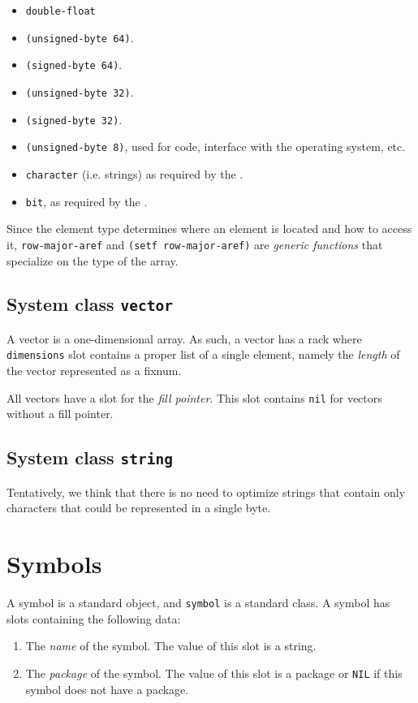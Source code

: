 \begin{itemize}
\item \texttt{double-float}
\item \texttt{(unsigned-byte 64)}.
\item \texttt{(signed-byte 64)}.
\item \texttt{(unsigned-byte 32)}.
\item \texttt{(signed-byte 32)}.
\item \texttt{(unsigned-byte 8)}, used for code, interface with the
  operating system, etc.
\item \texttt{character} (i.e. strings) as required by the \hs{}.
\item \texttt{bit}, as required by the \hs{}.
\end{itemize}

Since the element type determines where an element is located and how
to access it, \texttt{row-major-aref} and \texttt{(setf
  row-major-aref)} are \emph{generic functions} that specialize on the
type of the array.

\subsection{System class \texttt{vector}}

A vector is a one-dimensional array.  As such, a vector has a rack
where \texttt{dimensions} slot contains a proper list of a single
element, namely the \emph{length} of the vector represented as a
fixnum.

All vectors have a slot for the \emph{fill pointer}.  This slot
contains \texttt{nil} for vectors without a fill pointer.

\subsection{System class \texttt{string}}

Tentatively, we think that there is no need to optimize strings that
contain only characters that could be represented in a single byte.

\section{Symbols}

A symbol is a standard object, and \texttt{symbol} is a standard
class.  A symbol has slots containing the following data:

\begin{enumerate}
\item The \emph{name} of the symbol.  The value of this slot is a
  string.
\item The \emph{package} of the symbol.  The value of this slot is a
  package or \texttt{NIL} if this symbol does not have a package.
\end{enumerate}

